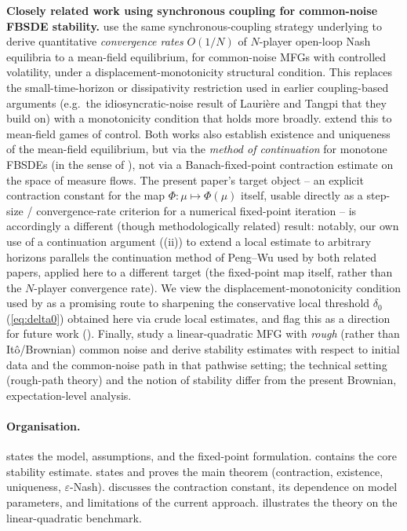 \documentclass[11pt]{article}
\theoremstyle{remark}
\begin{document}
\textbf{Closely related work using synchronous coupling for common-noise FBSDE
stability.} \citet{jacksontangpi2024} use the same synchronous-coupling strategy
underlying  to derive quantitative \emph{convergence rates}
$O(1/N)$ of $N$-player open-loop Nash equilibria to a mean-field equilibrium, for
common-noise MFGs with controlled volatility, under a displacement-monotonicity
structural condition. This replaces the small-time-horizon or dissipativity
restriction used in earlier coupling-based arguments (e.g.\ the idiosyncratic-noise
result of Lauri\`ere and Tangpi that they build on) with a monotonicity condition
that holds more broadly. \citet{jacksonmeszaros2025} extend this to mean-field
games of control. Both works also establish existence and uniqueness of the
mean-field equilibrium, but via the \emph{method of continuation} for monotone
FBSDEs (in the sense of \citealp{peng1999}), not via a Banach-fixed-point
contraction estimate on the space of measure flows. The present paper's target
object -- an explicit contraction constant for the map $\Phi:\mu \mapsto \Phi(\mu)$
itself, usable directly as a step-size / convergence-rate criterion for a numerical
fixed-point iteration -- is accordingly a different (though methodologically
related) result: notably, our own use of a continuation argument
((ii)) to extend a local estimate to arbitrary horizons
parallels the continuation method of Peng--Wu used by both related papers, applied
here to a different target (the fixed-point map itself, rather than the $N$-player
convergence rate). We view the displacement-monotonicity condition used by
\citet{jacksontangpi2024,jacksonmeszaros2025} as a promising route to sharpening
the conservative local threshold $\delta_0$ (\eqref{eq:delta0}) obtained here via
crude local estimates, and flag this as a direction for future work
().
Finally, \citet{frizetal2026} study a linear-quadratic MFG with \emph{rough} (rather
than It\^o/Brownian) common noise and derive stability estimates with respect to
initial data and the common-noise path in that pathwise setting; the technical
setting (rough-path theory) and the notion of stability differ from the present
Brownian, expectation-level analysis.

\paragraph{Organisation.}  states the model, assumptions, and the
fixed-point formulation.  contains the core stability estimate.
 states and proves the main theorem (contraction, existence,
uniqueness, $\varepsilon$-Nash).  discusses the contraction
constant, its dependence on model parameters, and limitations of the current
approach.  illustrates the theory on the linear-quadratic benchmark.
\end{document}
